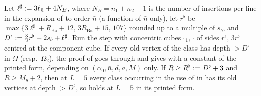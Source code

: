 \begin{proposition}\label{prop:a01:P12}
Let $\ell^\sharp:=3\ell_{\bar n}+4N_B$, where $N_B=n_1+n_2-1$ is the number of insertions per line in the expansion of \cite[p.~433]{Ba3} to order $\bar n$ (a function of $\bar n$ only), let $r^\flat$ be $\max\{3\ell^\sharp+R_{\mathrm{Ba}}+12,\,3R_{\mathrm{Ba}}+15,\,107\}$ rounded up to a multiple of $s_b$, and $D^\flat:=\frac32r^\flat+2s_b+\ell^\sharp$. Run the step with concentric cubes $\square_1,\square$ of sides $r^\flat$, $3r^\flat$ centred at the component cube. If every old vertex of the class has depth $>D^\flat$ in $\Omega$ (resp.\ $\Omega_2$), the proof of \cite[pp.~433--445]{Ba3} goes through and gives \cite[(1.33)]{Ba3} with a constant of the printed form, depending on $(\alpha_0,\bar n,d,a,M)$ only. If $R\ge R^\flat:= D^\flat+3$ and $R\ge M_\theta+2$, then at $L=5$ every class occurring in the use of \cite[Prop.~1]{Ba3} in \cite{Ba1,Ba2} has its old vertices at depth $>D^\flat$, so \cite[Prop.~1]{Ba3} holds at $L=5$ in its printed form.
\end{proposition}
